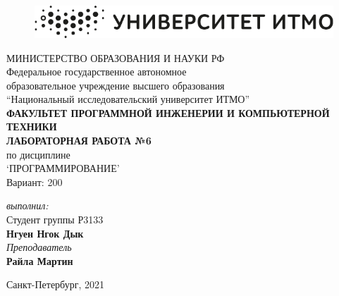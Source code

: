 \begin{center}

	\begin{figure}[H]
	\centering
	\includegraphics[scale=0.5]{img/logo}
	\end{figure}
	\hfill \break
	МИНИСТЕРСТВО ОБРАЗОВАНИЯ И НАУКИ РФ\\
	\hfill \break
	Федеральное государственное автономное\\
	образовательное учреждение высшего образования\\
	``Национальный исследовательский университет ИТМО''\\
	\hfill \break
	\textbf{ФАКУЛЬТЕТ ПРОГРАММНОЙ ИНЖЕНЕРИИ И КОМПЬЮТЕРНОЙ ТЕХНИКИ}\\
	\vspace{5cm}
	\large{\textbf{ЛАБОРАТОРНАЯ РАБОТА №6}}\\
	\hfill \break
	по дисциплине\\
	\large{`ПРОГРАММИРОВАНИЕ'}\\
	\hfill \break
	Вариант: 200
	
	\vspace{8cm}
	
	\begin{flushright}
	\textit{выполнил:}\\
	Студент группы Р3133\\
	\textbf{Нгуен Нгок Дык}\\
	\textit{Преподаватель}\\
	\textbf{Райла Мартин}
	\end{flushright}
\end{center}

\vfill


\begin{center} Санкт-Петербург, 2021
\end{center}

\thispagestyle{empty}
\newpage